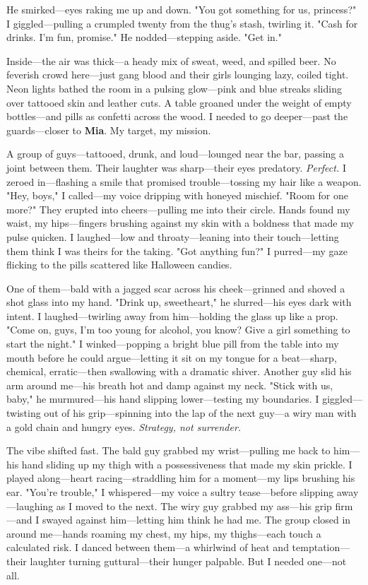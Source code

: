 \documentclass{article}
\begin{document}
He smirked—eyes raking me up and down. "You got something for us, princess?" I giggled—pulling a crumpled twenty from the thug’s stash, twirling it. "Cash for drinks. I’m fun, promise." He nodded—stepping aside. "Get in."

Inside—the air was thick—a heady mix of sweat, weed, and spilled beer. No feverish crowd here—just gang blood and their girls lounging lazy, coiled tight. Neon lights bathed the room in a pulsing glow—pink and blue streaks sliding over tattooed skin and leather cuts. A table groaned under the weight of empty bottles—and pills as confetti across the wood. I needed to go deeper—past the guards—closer to \textbf{Mia}. My target, my mission.

A group of guys—tattooed, drunk, and loud—lounged near the bar, passing a joint between them. Their laughter was sharp—their eyes predatory. \textit{Perfect.} I zeroed in—flashing a smile that promised trouble—tossing my hair like a weapon. "Hey, boys," I called—my voice dripping with honeyed mischief. "Room for one more?" They erupted into cheers—pulling me into their circle. Hands found my waist, my hips—fingers brushing against my skin with a boldness that made my pulse quicken. I laughed—low and throaty—leaning into their touch—letting them think I was theirs for the taking. "Got anything fun?" I purred—my gaze flicking to the pills scattered like Halloween candies.

One of them—bald with a jagged scar across his cheek—grinned and shoved a shot glass into my hand. "Drink up, sweetheart," he slurred—his eyes dark with intent. I laughed—twirling away from him—holding the glass up like a prop. "Come on, guys, I’m too young for alcohol, you know? Give a girl something to start the night." I winked—popping a bright blue pill from the table into my mouth before he could argue—letting it sit on my tongue for a beat—sharp, chemical, erratic—then swallowing with a dramatic shiver. Another guy slid his arm around me—his breath hot and damp against my neck. "Stick with us, baby," he murmured—his hand slipping lower—testing my boundaries. I giggled—twisting out of his grip—spinning into the lap of the next guy—a wiry man with a gold chain and hungry eyes. \textit{Strategy, not surrender.}

The vibe shifted fast. The bald guy grabbed my wrist—pulling me back to him—his hand sliding up my thigh with a possessiveness that made my skin prickle. I played along—heart racing—straddling him for a moment—my lips brushing his ear. "You’re trouble," I whispered—my voice a sultry tease—before slipping away—laughing as I moved to the next. The wiry guy grabbed my ass—his grip firm—and I swayed against him—letting him think he had me. The group closed in around me—hands roaming my chest, my hips, my thighs—each touch a calculated risk. I danced between them—a whirlwind of heat and temptation—their laughter turning guttural—their hunger palpable. But I needed one—not all.
\end{document}
